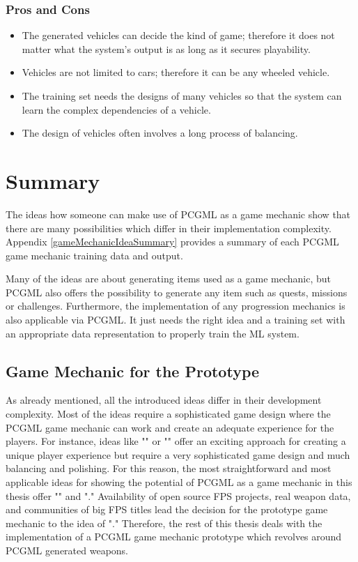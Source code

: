 \documentclass[MGS,Master,english]{twbook}%
\begin{document}
\subsubsection{Pros and Cons}
\begin{itemize}
	\item The generated vehicles can decide the kind of game; therefore it does not matter what the system's output is as long as it secures playability.
	\item Vehicles are not limited to cars; therefore it can be any wheeled vehicle.
	\item The training set needs the designs of many vehicles so that the system can learn the complex dependencies of a vehicle.
	\item The design of vehicles often involves a long process of balancing.
\end{itemize}

\section{Summary}
The ideas how someone can make use of \ac{PCGML} as a game mechanic show that there are many possibilities which differ in their implementation complexity. Appendix \ref{gameMechanicIdeaSummary} provides a summary of each \ac{PCGML} game mechanic training data and output.

Many of the ideas are about generating items used as a game mechanic, but \ac{PCGML} also offers the possibility to generate any item such as quests, missions or challenges. Furthermore, the implementation of any progression mechanics is also applicable via \ac{PCGML}. It just needs the right idea and a training set with an appropriate data representation to properly train the \ac{ML} system.

\subsection{Game Mechanic for the Prototype}
As already mentioned, all the introduced ideas differ in their development complexity. Most of the ideas require a sophisticated game design where the \ac{PCGML} game mechanic can work and create an adequate experience for the players. For instance, ideas like "" or "" offer an exciting approach for creating a unique player experience but require a very sophisticated game design and much balancing and polishing. For this reason, the most straightforward and most applicable ideas for showing the potential of \ac{PCGML} as a game mechanic in this thesis offer "" and "." Availability of open source \ac{FPS} projects, real weapon data, and communities of big \ac{FPS} titles lead the decision for the prototype game mechanic to the idea of "." Therefore, the rest of this thesis deals with the implementation of a \ac{PCGML} game mechanic prototype which revolves around \ac{PCGML} generated weapons.
\end{document}
